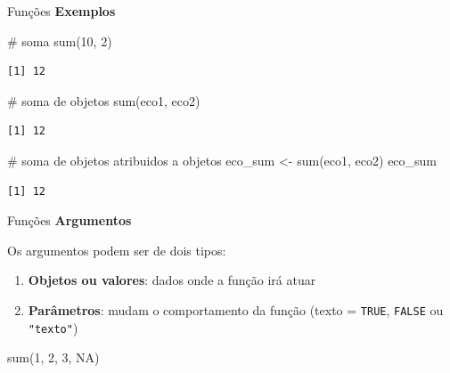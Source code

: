 \documentclass[
  ignorenonframetext,
]{beamer}
\newenvironment{Shaded}{\begin{snugshade}}{\end{snugshade}}
\newcommand{\CommentTok}[1]{\textcolor[rgb]{0.37,0.37,0.37}{#1}}
\newcommand{\ConstantTok}[1]{\textcolor[rgb]{0.56,0.35,0.01}{#1}}
\newcommand{\DecValTok}[1]{\textcolor[rgb]{0.68,0.00,0.00}{#1}}
\newcommand{\FunctionTok}[1]{\textcolor[rgb]{0.28,0.35,0.67}{#1}}
\newcommand{\NormalTok}[1]{\textcolor[rgb]{0.00,0.23,0.31}{#1}}
\newcommand{\OtherTok}[1]{\textcolor[rgb]{0.00,0.23,0.31}{#1}}
\begin{document}
\begin{frame}[fragile]
\begin{block}{Funções}
\protect\hypertarget{funuxe7uxf5es-1}{}
\textbf{Exemplos}

\begin{Shaded}
\begin{Highlighting}[]
\CommentTok{\# soma}
\FunctionTok{sum}\NormalTok{(}\DecValTok{10}\NormalTok{, }\DecValTok{2}\NormalTok{)}
\end{Highlighting}
\end{Shaded}

\begin{verbatim}
[1] 12
\end{verbatim}

\begin{Shaded}
\begin{Highlighting}[]
\CommentTok{\# soma de objetos}
\FunctionTok{sum}\NormalTok{(eco1, eco2)}
\end{Highlighting}
\end{Shaded}

\begin{verbatim}
[1] 12
\end{verbatim}

\begin{Shaded}
\begin{Highlighting}[]
\CommentTok{\# soma de objetos atribuidos a objetos}
\NormalTok{eco\_sum }\OtherTok{\textless{}{-}} \FunctionTok{sum}\NormalTok{(eco1, eco2)}
\NormalTok{eco\_sum}
\end{Highlighting}
\end{Shaded}

\begin{verbatim}
[1] 12
\end{verbatim}
\end{block}

\begin{block}{Funções}
\protect\hypertarget{funuxe7uxf5es-2}{}
\textbf{Argumentos}

Os argumentos podem ser de dois tipos:

\begin{enumerate}
\item
  \textbf{Objetos ou valores}: dados onde a função irá atuar
\item
  \textbf{Parâmetros}: mudam o comportamento da função (texto =
  \texttt{TRUE}, \texttt{FALSE} ou \texttt{"texto"})
\end{enumerate}

\begin{Shaded}
\begin{Highlighting}[]
\FunctionTok{sum}\NormalTok{(}\DecValTok{1}\NormalTok{, }\DecValTok{2}\NormalTok{, }\DecValTok{3}\NormalTok{, }\ConstantTok{NA}\NormalTok{)}
\end{Highlighting}
\end{Shaded}


\end{block}
\end{frame}
\end{document}
